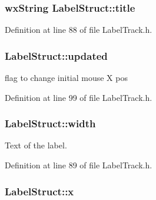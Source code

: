 \subsubsection[{\texorpdfstring{title}{title}}]{\setlength{\rightskip}{0pt plus 5cm}wx\+String Label\+Struct\+::title}\hypertarget{class_label_struct_ab3b60ea3a2f089605a60277c1d7ecab3}{}\label{class_label_struct_ab3b60ea3a2f089605a60277c1d7ecab3}


Definition at line 88 of file Label\+Track.\+h.

\subsubsection[{\texorpdfstring{updated}{updated}}]{ Label\+Struct\+::updated}\hypertarget{class_label_struct_ae3885ef0e16798f57e24f7f996921338}{}\label{class_label_struct_ae3885ef0e16798f57e24f7f996921338}


flag to change initial mouse X pos 



Definition at line 99 of file Label\+Track.\+h.

\subsubsection[{\texorpdfstring{width}{width}}]{ Label\+Struct\+::width}\hypertarget{class_label_struct_ae81abfcb1628d7c4931e06f56a319e9f}{}\label{class_label_struct_ae81abfcb1628d7c4931e06f56a319e9f}


Text of the label. 



Definition at line 89 of file Label\+Track.\+h.

\subsubsection[{\texorpdfstring{x}{x}}]{ Label\+Struct\+::x}\hypertarget{class_label_struct_a3cf92d0baf6b76efa1b16edce3665fb0}{}\label{class_label_struct_a3cf92d0baf6b76efa1b16edce3665fb0}


